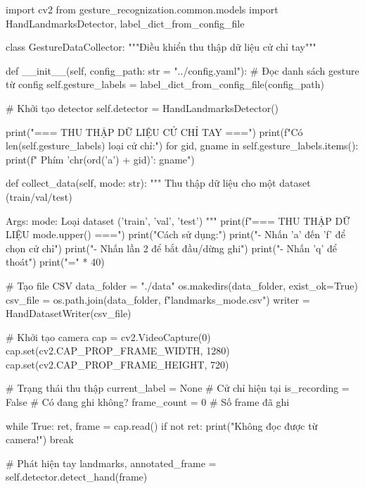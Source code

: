 \begin{aivncodebox}
\begin{python}
import cv2
from gesture_recognization.common.models import HandLandmarksDetector, label_dict_from_config_file

class GestureDataCollector:
    """Điều khiển thu thập dữ liệu cử chỉ tay"""
    
    def __init__(self, config_path: str = "../config.yaml"):
        # Đọc danh sách gesture từ config
        self.gesture_labels = label_dict_from_config_file(config_path)
        
        # Khởi tạo detector
        self.detector = HandLandmarksDetector()
        
        print("=== THU THẬP DỮ LIỆU CỬ CHỈ TAY ===")
        print(f"Có {len(self.gesture_labels)} loại cử chỉ:")
        for gid, gname in self.gesture_labels.items():
            print(f"  Phím '{chr(ord('a') + gid)}': {gname}")
    
    def collect_data(self, mode: str):
        """
        Thu thập dữ liệu cho một dataset (train/val/test)
        
        Args:
            mode: Loại dataset ('train', 'val', 'test')
        """
        print(f"\n=== THU THẬP DỮ LIỆU {mode.upper()} ===")
        print("Cách sử dụng:")
        print("- Nhấn 'a' đến 'f' để chọn cử chỉ")
        print("- Nhấn lần 2 để bắt đầu/dừng ghi")
        print("- Nhấn 'q' để thoát")
        print("=" * 40)
        
        # Tạo file CSV
        data_folder = "./data"
        os.makedirs(data_folder, exist_ok=True)
        csv_file = os.path.join(data_folder, f"landmarks_{mode}.csv")
        writer = HandDatasetWriter(csv_file)
        
        # Khởi tạo camera
        cap = cv2.VideoCapture(0)
        cap.set(cv2.CAP_PROP_FRAME_WIDTH, 1280)
        cap.set(cv2.CAP_PROP_FRAME_HEIGHT, 720)
        
        # Trạng thái thu thập
        current_label = None    # Cử chỉ hiện tại
        is_recording = False    # Có đang ghi không?
        frame_count = 0         # Số frame đã ghi
        
        while True:
            ret, frame = cap.read()
            if not ret:
                print("Không đọc được từ camera!")
                break
            
            # Phát hiện tay
            landmarks, annotated_frame = self.detector.detect_hand(frame)
            

\end{python}
\end{aivncodebox}
